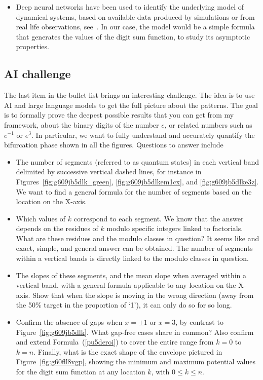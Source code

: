 \documentclass[10pt]{article}
\begin{document}
\begin{itemize}
\item \textcolor{index}{Deep neural networks} have been used  to identify the underlying model of dynamical systems, based on available data produced by 
simulations or from real life observations, see~\cite{botuliee4j, bkw3r,retuloi}. In our case, the model would be a simple formula that generates the values
 of the digit sum function, to study its asymptotic properties. 
\end{itemize}
\vspace{1ex}

\subsection{AI challenge}

\noindent The last item in the bullet list brings an interesting challenge. The idea is to use AI and large language models to get the full picture about the patterns. The goal is to formally prove the deepest possible results that you can get from my framework, about the binary digits of the 
 number $e$, or related numbers such as $e^{-1}$ or $e^3$. In particular, we want to fully understand and accurately quantify the bifurcation phase shown in all the figures. Questions to answer include
\vspace{1ex}
\begin{itemize}
\item The number of segments (referred to as \textcolor{index}{quantum states}) in each vertical band delimited by successive vertical dashed lines, for instance in Figures~\ref{fig:g609jb5dlk_green}, \ref{fig:g609jb5dlkem1cx}, and \ref{fig:g609jb5dlke3z}.
We want to find a general formula for the number of segments based on the location on the X-axis. 
\item Which values of $k$ correspond to each segment. We know that the answer depends on the residues of $k$ modulo specific integers linked to factorials. What are these residues and the modulo classes in question? It seems like and exact, simple, and general answer can be obtained.
The number of segments within a vertical bands is directly linked to the modulo classes in question. 
\item The slopes of these segments, and the mean slope when averaged within a vertical band, with a general formula applicable to any location on the X-axis. Show that when the slope is moving in the wrong direction (away from the 50\% target in the proportion of `1'), it can only do so for so long. 
\item Confirm the absence of gaps when $x=\pm 1$ or $x=3$, by contrast to Figure~\ref{fig:g609jb5dlk}. What gap-free cases share in common? 
Also confirm and extend Formula~(\ref{pu5deroi}) to cover the entire range from $k=0$ to $k=n$.
Finally, what is the exact shape of the envelope pictured in Figure~\ref{fig:g60fll8vgp}, showing the minimum and maximum potential values 
 for the digit sum function at any location $k$, with $0\leq k\leq n$. 

\end{itemize}
\vspace{1ex}
\end{document}
